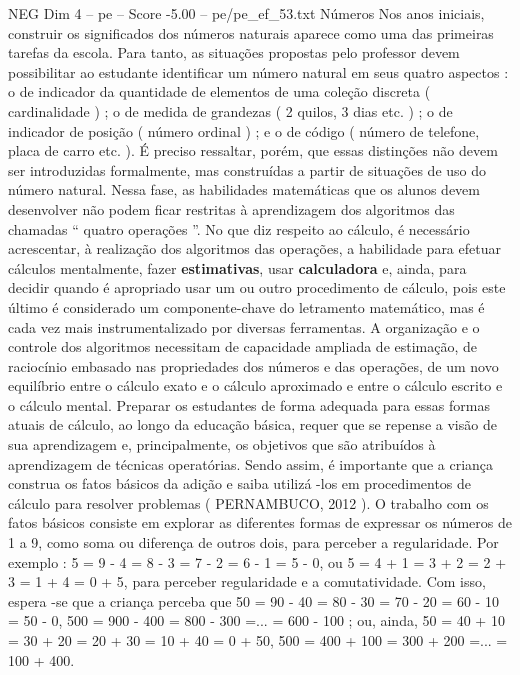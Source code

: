 \begin{textsample}{NEG Dim 4 – pe – Score -5.00 – pe/pe\_ef\_53.txt}  \label{ex:f4_neg_001}
Números Nos anos iniciais, construir os significados dos números naturais aparece como uma das primeiras tarefas da escola.
Para tanto, as situações propostas pelo professor devem possibilitar ao estudante identificar um número natural em seus quatro aspectos : o de indicador da quantidade de elementos de uma coleção discreta ( cardinalidade ) ; o de medida de grandezas ( 2 quilos, 3 dias etc. ) ; o de indicador de posição ( número ordinal ) ; e o de código ( número de telefone, placa de carro etc. ).
É preciso ressaltar, porém, que essas distinções não devem ser introduzidas formalmente, mas construídas a partir de situações de uso do número natural.
Nessa fase, as habilidades matemáticas que os alunos devem desenvolver não podem ficar restritas à aprendizagem dos algoritmos das chamadas “ quatro operações ”.
No que diz respeito ao cálculo, é necessário acrescentar, à realização dos algoritmos das operações, a habilidade para efetuar cálculos mentalmente, fazer \textbf{estimativas}, usar \textbf{calculadora} e, ainda, para decidir quando é apropriado usar um ou outro procedimento de cálculo, pois este último é considerado um componente-chave do letramento matemático, mas é cada vez mais instrumentalizado por diversas ferramentas.
A organização e o controle dos algoritmos necessitam de capacidade ampliada de estimação, de raciocínio embasado nas propriedades dos números e das operações, de um novo equilíbrio entre o cálculo exato e o cálculo aproximado e entre o cálculo escrito e o cálculo mental.
Preparar os estudantes de forma adequada para essas formas atuais de cálculo, ao longo da educação básica, requer que se repense a visão de sua aprendizagem e, principalmente, os objetivos que são atribuídos à aprendizagem de técnicas operatórias.
Sendo assim, é importante que a criança construa os fatos básicos da adição e saiba utilizá -los em procedimentos de cálculo para resolver problemas ( PERNAMBUCO, 2012 ).
O trabalho com os fatos básicos consiste em explorar as diferentes formas de expressar os números de 1 a 9, como soma ou diferença de outros dois, para perceber a regularidade.
Por exemplo : 5 = 9 - 4 = 8 - 3 = 7 - 2 = 6 - 1 = 5 - 0, ou 5 = 4 + 1 = 3 + 2 = 2 + 3 = 1 + 4 = 0 + 5, para perceber regularidade e a comutatividade.
Com isso, espera -se que a criança perceba que 50 = 90 - 40 = 80 - 30 = 70 - 20 = 60 - 10 = 50 - 0, 500 = 900 - 400 = 800 - 300 =... = 600 - 100 ; ou, ainda, 50 = 40 + 10 = 30 + 20 = 20 + 30 = 10 + 40 = 0 + 50, 500 = 400 + 100 = 300 + 200 =... = 100 + 400.

\end{textsample}
